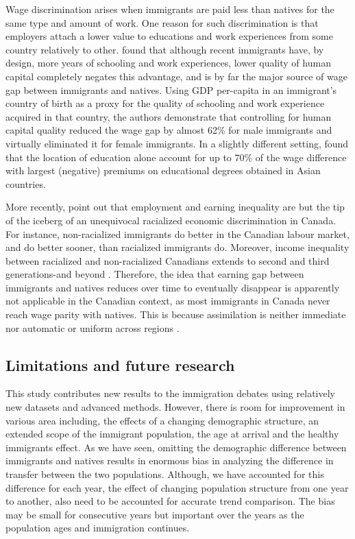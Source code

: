 \vspace{0.7em}\par
Wage discrimination arises when immigrants are paid less than natives for the same type and amount of work.
One reason for such discrimination is that employers attach a lower value to educations and work experiences from some country relatively to other.
\citet{Coulombe:2014ir} found that although recent immigrants have, by design, more years of schooling and work experiences, lower quality of human capital completely negates this advantage, and is by far the major source of wage gap between immigrants and natives.
Using GDP per-capita in an immigrant's country of birth as a proxy for the quality of schooling and work experience acquired in that country, the authors demonstrate that controlling for human capital quality reduced the wage gap by almost 62\% for male immigrants and virtually eliminated it for female immigrants.
In a slightly different setting, \citet{Fortin:2016hl} found that the location of education alone account for up to 70\% of the wage difference with largest (negative) premiums on educational degrees obtained in Asian countries.

\vspace{0.7em}\par
More recently,  \citet{Block:2019va} point out that employment and earning inequality are but the tip of the iceberg of an unequivocal racialized economic discrimination in Canada.
For instance, non-racialized immigrants do better in the Canadian labour market, and do better sooner, than racialized immigrants do.
Moreover, income inequality between racialized and non-racialized Canadians extends to second and third generations-and beyond \citep{Block:2019va}.
Therefore, the idea that earning gap between immigrants and natives reduces over time to eventually disappear is apparently not applicable in the Canadian context, as most immigrants in Canada never reach wage parity with natives.
This is because assimilation is neither immediate nor automatic \citep{Hum:2000gz} or uniform across regions \citep{Nadeau:2010jd}.


\subsection{Limitations and future research}

This study contributes new results to the immigration debates using relatively new datasets and advanced methods.
However, there is room for improvement in various area including, the effects of a changing demographic structure, an extended scope of the immigrant population, the age at arrival and the healthy immigrants effect.
As we have seen, omitting the demographic difference between immigrants and natives results in enormous bias in analyzing the difference in transfer between the two populations.
Although, we have accounted for this difference for each year, the effect of changing population structure from one year to another, also need to be accounted for accurate trend comparison.
The bias may be small for consecutive years but important over the years as the population ages and immigration continues.

